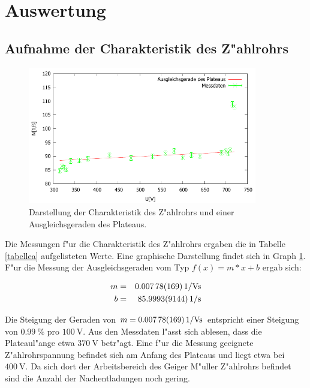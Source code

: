 \section{Auswertung}
	\label{sec:auswertung}

	\subsection{Aufnahme der Charakteristik des Z"ahlrohrs} %
	\label{sub:z_ahlrohr_charakteristik}

	

	\begin{figure}[!h]
		\centering	
		\includegraphics[width = 10cm]{img/charakteristik.pdf}
		\caption{Darstellung der Charakteristik des Z"ahlrohrs und einer Ausgleichsgeraden des Plateaus.}
		\label{charakteristik}
	\end{figure}

	Die Messungen f"ur die Charakteristik des Z"ahlrohrs ergaben die in Tabelle \ref{tabellea} aufgelisteten Werte. Eine graphische Darstellung findet sich in Graph \ref{charakteristik}.
	F"ur die Messung der Ausgleichsgeraden vom Typ $f(x) = m*x+b$ ergab sich:

	\begin{eqnarray*}
		m &=& \SI{0.00778 (169)}{1\per\volt\second}\\
		b &=& \SI{85.9993 (9144)}{1\per\second}
	\end{eqnarray*}

	Die Steigung der Geraden von $m = \SI{0.00778 (169)}{1\per\volt\second}$ entspricht einer Steigung von $\SI{0.99}{\%}$ pro $\SI{100}{\volt}$.
	Aus den Messdaten l"asst sich ablesen, dass die Plateaul"ange etwa $\SI{370}{\volt}$ betr"agt.
	Eine f"ur die Messung geeignete Z"ahlrohrspannung befindet sich am Anfang des Plateaus und liegt etwa bei $\SI{400}{\volt}$. Da sich dort der Arbeitsbereich des Geiger M"uller Z"ahlrohrs befindet sind die Anzahl der Nachentladungen noch gering.

